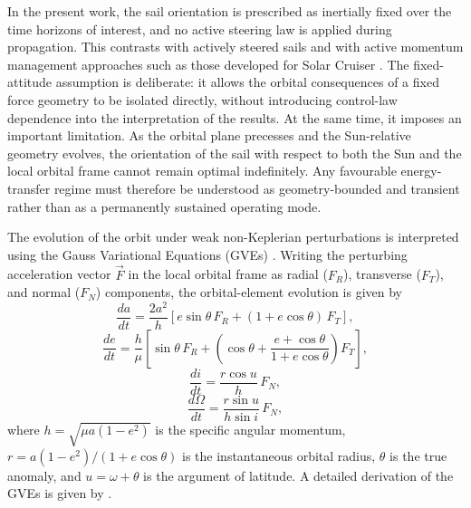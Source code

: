 \vspace{5pt}
\par\noindent In the present work, the sail orientation is prescribed as inertially fixed over the time horizons of interest, and no active steering law is applied during propagation. This contrasts with actively steered sails \citep{dachwaldOptimalSolarSail2005,quartaOptimalInterplanetaryTrajectories2023} and with active momentum management approaches such as those developed for Solar Cruiser \citep{cannellaDesignOverviewSolar2021,shenSolarSailMomentum2026}. The fixed-attitude assumption is deliberate: it allows the orbital consequences of a fixed force geometry to be isolated directly, without introducing control-law dependence into the interpretation of the results. At the same time, it imposes an important limitation. As the orbital plane precesses and the Sun-relative geometry evolves, the orientation of the sail with respect to both the Sun and the local orbital frame cannot remain optimal indefinitely. Any favourable energy-transfer regime must therefore be understood as geometry-bounded and transient rather than as a permanently sustained operating mode.



\vspace{5pt}
\par\noindent The evolution of the orbit under weak non-Keplerian perturbations is interpreted using the Gauss Variational Equations (GVEs) \citep{vallado2007,battin1999}. Writing the perturbing acceleration vector \( \vec{F} \) in the local orbital frame as radial (\(F_R\)), transverse (\(F_T\)), and normal (\(F_N\)) components, the orbital-element evolution is given by
\begin{equation}
\frac{da}{dt} = \frac{2a^2}{h} \left[ e \sin{\theta} \, F_R + (1 + e \cos{\theta}) \, F_T \right],
\label{eq:da}
\end{equation}
\begin{equation}
\frac{de}{dt} = \frac{h}{\mu} \left[ \sin{\theta} \, F_R + \left( \cos{\theta} + \frac{e + \cos{\theta}}{1 + e \cos{\theta}} \right) F_T \right],
\label{eq:de}
\end{equation}
\begin{equation}
\frac{di}{dt} = \frac{r \cos{u}}{h} \, F_N,
\label{eq:di}
\end{equation}
\begin{equation}
\frac{d\Omega}{dt} = \frac{r \sin{u}}{h \sin{i}} \, F_N,
\label{eq:domega}
\end{equation}
where \( h = \sqrt{\mu a (1 - e^2)} \) is the specific angular momentum, \( r = a(1 - e^2)/(1 + e \cos{\theta}) \) is the instantaneous orbital radius, \( \theta \) is the true anomaly, and \( u = \omega + \theta \) is the argument of latitude. A detailed derivation of the GVEs is given by \citet{vallado2007}.

